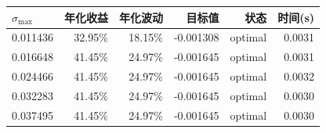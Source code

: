 \begin{center}
\small
\begin{tabular}{lrrrrr}
\toprule
$\sigma_{\max}$ & 年化收益 & 年化波动 & 目标值 & 状态 & 时间(s) \\
\midrule
0.011436 & 32.95\% & 18.15\% & -0.001308 & optimal & 0.0031 \\
0.016648 & 41.45\% & 24.97\% & -0.001645 & optimal & 0.0031 \\
0.024466 & 41.45\% & 24.97\% & -0.001645 & optimal & 0.0032 \\
0.032283 & 41.45\% & 24.97\% & -0.001645 & optimal & 0.0030 \\
0.037495 & 41.45\% & 24.97\% & -0.001645 & optimal & 0.0030 \\
\bottomrule
\end{tabular}
\end{center}